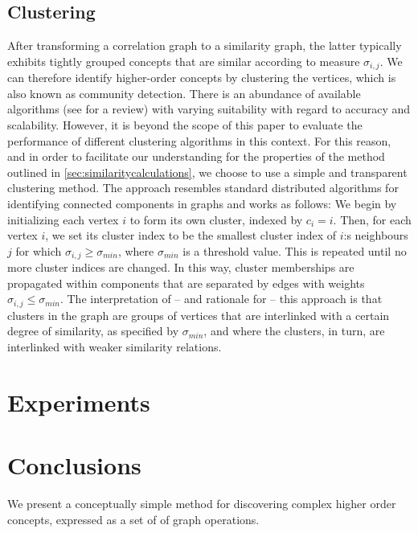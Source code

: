 \documentclass{sig-alternate}
\newcommand{\sy}[1]{\sigma_{#1}}
\begin{document}
\subsection{Clustering}
\begin{sloppypar}
After transforming a correlation graph to a similarity graph, the latter typically exhibits tightly grouped
concepts that are similar according to measure $\sy{i,j}$. We can therefore identify higher-order concepts by
clustering the vertices, which is also known as community detection. There is an abundance of available algorithms
(see \cite{Fortunato-2010} for a review) with varying suitability with regard to accuracy and scalability. However, it is
beyond the scope of this paper to evaluate the performance of different clustering algorithms in this context.
For this reason, and in order to facilitate
our understanding for the properties of the method outlined in \ref{sec:similaritycalculations},
we choose to use a simple and transparent clustering method. The approach resembles standard distributed algorithms
for identifying connected components in graphs and works as follows: We begin by initializing
each vertex $i$ to form its own cluster, indexed by $c_i = i$. Then, for each vertex $i$, we set its cluster index to be the smallest cluster
index of $i$:s neighbours $j$ for which $\sy{i,j} \geq \sigma_{min}$, where $\sigma_{min}$ is a threshold value. This is repeated until no more cluster indices are changed. In this way, cluster memberships are propagated within
components that are separated by edges with weights $\sy{i,j} \leq  \sigma_{min}$. The interpretation of --
and rationale for -- this approach is that clusters in the graph are groups of vertices that are interlinked with a certain degree of similarity,
as specified by $\sigma_{min}$, and where the clusters, in turn, are interlinked with weaker similarity relations.
\end{sloppypar}


\section{Experiments}

\section{Conclusions}

We present a conceptually simple method for discovering complex higher order concepts, expressed as a set of of graph operations.




\balancecolumns
\end{document}

